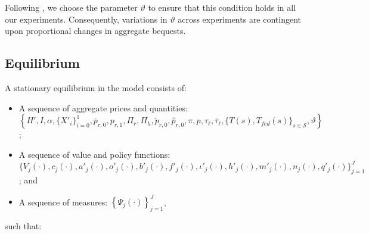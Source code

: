 \documentclass[parskip=full]{article}
\begin{document}
\noindent Following \citet{kkk-2021}, we choose the parameter $\vartheta$ to ensure that this condition holds in all our experiments. Consequently, variations in $\vartheta$ across experiments are contingent upon proportional changes in aggregate bequests.

\subsection{Equilibrium}
A stationary equilibrium in the model consists of: 
\begin{itemize}
   \item A sequence of aggregate prices and quantities:\\   
    $\left\{H', I, \alpha, \{X'_{i}\}_{i=0}^{1},    \overline{p}_{r,0}, p_{r,1}, \Pi_r, \Pi_h, \tilde{p}_{r,0}, \hat{p}_{r,0}, \pi, p, \tau_{\ell}, \overline{\tau}_{\ell}, \{T(s), T_{fed}(s)\}_{s \in \mathcal{S}}, \vartheta \right\}$;
    \item A sequence of value and policy functions: \\
    $\biggl\{V_{j}(\cdot),c_{j}(\cdot),a'_{j}(\cdot),o'_{j}(\cdot),b'_{j}(\cdot),f'_{j}(\cdot),\iota'_{j}(\cdot),h'_{j}(\cdot),m'_{j}(\cdot),n_{j}(\cdot),q'_{j}(\cdot)\biggl\}_{j=1}^J$; and
    \item A sequence of measures: 
     $\left\{\Psi_{j}(\cdot)\right\}_{j=1}^J$,
\end{itemize}
\noindent such that:
\end{document}
